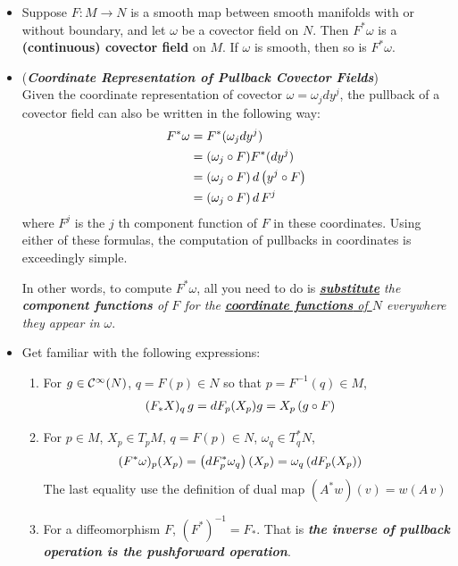 \documentclass[11pt]{article}
\begin{document}
\begin{itemize}
\item \begin{proposition}
Suppose $F: M \rightarrow N$  is a smooth map between smooth manifolds with or without boundary, and let $\omega$ be a covector field on $N$. Then $F^{*}\omega$ is a
\textbf{(continuous) covector field} on $M$. If $\omega$ is smooth, then so is $F^{*}\omega$.
\end{proposition}

\item \begin{remark} (\emph{\textbf{Coordinate Representation of Pullback Covector Fields}})\\
Given the  coordinate representation of covector  $\omega = \omega_{j}dy^{j}$, the pullback of a covector field  can also be written in the
following way:
\begin{align}
F^{*}\omega &= F^{*}(\omega_{j}dy^{j}) \nonumber\\
&= (\omega_{j} \circ F) F^{*}(dy^{j}) \nonumber\\
&= (\omega_{j} \circ F)\, d\left(y^{j} \circ F\right)  \label{eqn: pullback_covector_field_decompo_1}\\
&= (\omega_{j} \circ F) \,d\,F^{j}  \label{eqn: pullback_covector_field_decompo_2}
\end{align} where  $F^j$ is the $j$ th component function of $F$ in these coordinates. Using either of
these formulas, the computation of pullbacks in coordinates is exceedingly simple.

In other words, to compute $F^{*}\omega$, all you need to do is \emph{\underline{\textbf{substitute}} the \textbf{component functions} of $F$ for the \underline{\textbf{coordinate functions} of $N$} everywhere they appear in $\omega$}.
\end{remark}

\item \begin{remark} Get familiar with the following expressions:
\begin{enumerate}
\item For $g \in {\mathcal C}^{\infty}(N)$, $q = F(p) \in N$ so that $p= F^{-1}(q) \in M$, 
\begin{align*}
(F_{*}X)_{q}\,g &= dF_{p}(X_{p})g = X_{p}\left(g \circ F\right) 
\end{align*}

\item For $p\in M$, $X_{p} \in T_{p}M$, $q = F(p) \in N$, $\omega_{q} \in T_{q}^{*}N$, 
\begin{align*}
(F^{*}\omega)_{p}(X_{p}) &= \left(dF_{p}^{*}\omega_{q}\right)\left(X_{p}\right) = \omega_{q}\left(dF_{p}(X_{p})\right)
\end{align*} The last equality use the definition of dual map $(A^{*}w)(v) = w(A\,v)$

\item For a diffeomorphism $F$, $(F^{*})^{-1} = F_{*}$. That is \textbf{\emph{the inverse of pullback operation is the pushforward operation}}.
\end{enumerate}
\end{remark}
\end{itemize}
\end{document}
